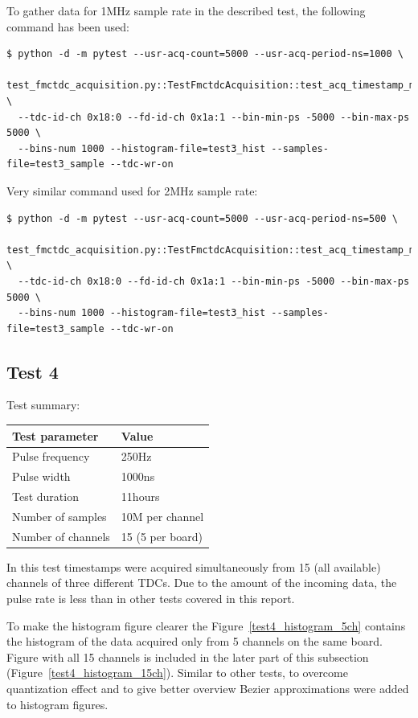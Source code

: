 \documentclass[a4paper, 12pt]{article}
\begin{document}
To gather data for 1MHz sample rate in the described test,
the following command has been used:
\begin{lstlisting}
$ python -d -m pytest --usr-acq-count=5000 --usr-acq-period-ns=1000 \
  test_fmctdc_acquisition.py::TestFmctdcAcquisition::test_acq_timestamp_multiple_hist \
  --tdc-id-ch 0x18:0 --fd-id-ch 0x1a:1 --bin-min-ps -5000 --bin-max-ps 5000 \
  --bins-num 1000 --histogram-file=test3_hist --samples-file=test3_sample --tdc-wr-on
\end{lstlisting}

Very similar command used for 2MHz sample rate:
\begin{lstlisting}
$ python -d -m pytest --usr-acq-count=5000 --usr-acq-period-ns=500 \
  test_fmctdc_acquisition.py::TestFmctdcAcquisition::test_acq_timestamp_multiple_hist \
  --tdc-id-ch 0x18:0 --fd-id-ch 0x1a:1 --bin-min-ps -5000 --bin-max-ps 5000 \
  --bins-num 1000 --histogram-file=test3_hist --samples-file=test3_sample --tdc-wr-on
\end{lstlisting}

\FloatBarrier

\subsection{Test 4}
\label{test4}

Test summary:
\begin{center}
  \begin{tabular}{|l|l|}
    \hline {\bf Test parameter} & {\bf Value} \\
    \hline
    Pulse frequency                      & 250Hz \\
    Pulse width                          & 1000ns \\
    Test duration                        & 11hours \\
    Number of samples                    & 10M per channel \\
    Number of channels                   & 15 (5 per board) \\
    \hline
  \end{tabular}
\end{center}

In this test timestamps were acquired simultaneously from 15 (all available)
channels of three different TDCs. Due to the amount of the incoming data,
the pulse rate is less than in other tests covered in this report.


To make the histogram figure clearer the Figure~\ref{test4_histogram_5ch}
contains the histogram of the data acquired
only from 5 channels on the same board. Figure with all 15 channels
is included in the later part of this subsection
(Figure~\ref{test4_histogram_15ch}).
Similar to other tests, to overcome quantization effect and to give better
overview Bezier approximations were added to histogram figures.
\end{document}
